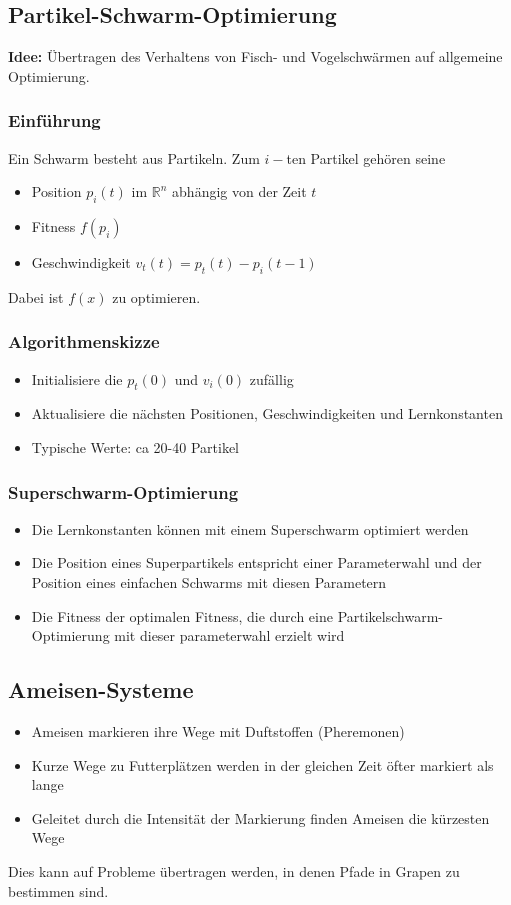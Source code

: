 \subsection{Partikel-Schwarm-Optimierung}
\textbf{Idee:} Übertragen des Verhaltens von Fisch- und Vogelschwärmen auf allgemeine Optimierung.

\subsubsection{Einführung}
Ein Schwarm besteht aus Partikeln. Zum \(i-\)ten Partikel gehören seine
\begin{itemize}
	\item Position \(p_i(t)\) im \(\mathbb{R}^n\) abhängig von der Zeit \(t\)
	\item Fitness \(f(p_i)\)
	\item Geschwindigkeit \(v_t(t) = p_t(t)-p_i(t-1)\)
\end{itemize}
Dabei ist \(f(x)\) zu optimieren.

\subsubsection{Algorithmenskizze}
\begin{itemize}
	\item Initialisiere die \(p_t(0)\) und \(v_i(0)\) zufällig
	\item Aktualisiere die nächsten Positionen, Geschwindigkeiten und Lernkonstanten
	\item Typische Werte: ca 20-40 Partikel
\end{itemize}


\subsubsection{Superschwarm-Optimierung}
\begin{itemize}
	\item Die Lernkonstanten können mit einem Superschwarm optimiert werden
	\item Die Position eines Superpartikels entspricht einer Parameterwahl und der Position eines einfachen Schwarms mit diesen Parametern
	\item Die Fitness der optimalen Fitness, die durch eine Partikelschwarm-Optimierung mit dieser parameterwahl erzielt wird
\end{itemize}


\subsection{Ameisen-Systeme}
\begin{itemize}
	\item Ameisen markieren ihre Wege mit Duftstoffen (Pheremonen)
	\item Kurze Wege zu Futterplätzen werden in der gleichen Zeit öfter markiert als lange
	\item Geleitet durch die Intensität der Markierung finden Ameisen die kürzesten Wege
\end{itemize}
Dies kann auf Probleme übertragen werden, in denen Pfade in Grapen zu bestimmen sind.

